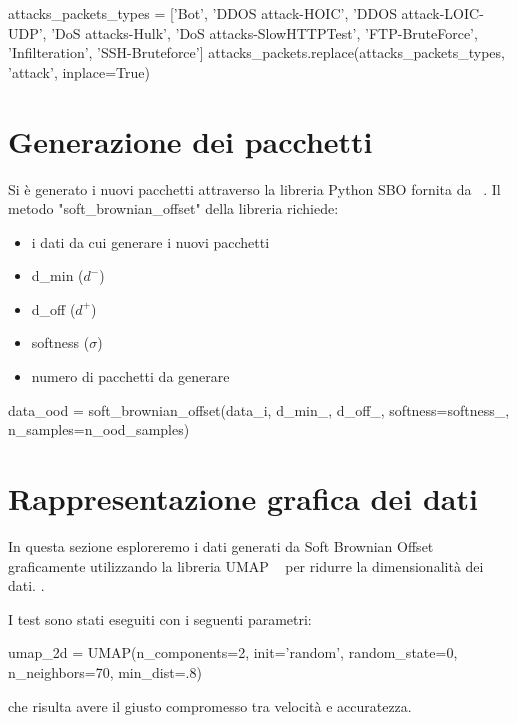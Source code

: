 \begin{python}
attacks_packets_types = ['Bot', 'DDOS attack-HOIC', 'DDOS attack-LOIC-UDP',
                            'DoS attacks-Hulk', 'DoS attacks-SlowHTTPTest', 'FTP-BruteForce',
                            'Infilteration', 'SSH-Bruteforce']
attacks_packets.replace(attacks_packets_types, 'attack', inplace=True)
\end{python}


\section{Generazione dei pacchetti}

Si è generato i nuovi pacchetti attraverso la libreria Python SBO fornita da ~\cite{sbo}. Il metodo "soft\_brownian\_offset" della libreria richiede:

\begin{itemize}
    \item i dati da cui generare i nuovi pacchetti
    \item d\_min ($d^{-}$)
    \item d\_off ($d^{+}$)
    \item softness ($\sigma$)
    \item numero di pacchetti da generare
\end{itemize}

\begin{python}
data_ood = soft_brownian_offset(data_i, d_min_, d_off_,
                                    softness=softness_,
                                  n_samples=n_ood_samples)
\end{python}


\section{Rappresentazione grafica dei dati}
 
In questa sezione esploreremo i dati generati da Soft Brownian Offset graficamente utilizzando la libreria UMAP ~\cite{umap} per ridurre la dimensionalità dei dati. . 

I test sono stati eseguiti con i seguenti parametri:

\begin{python}
umap_2d = UMAP(n_components=2, init='random', random_state=0,
               n_neighbors=70, min_dist=.8)
\end{python}

che risulta avere il giusto compromesso tra velocità e accuratezza.

